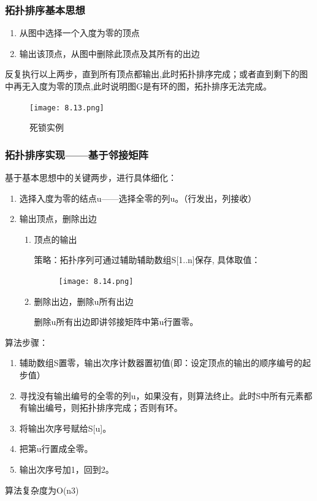 \documentclass[AutoFakeBold]{LZUThesis2007}
\begin{document}
			\subsubsection{拓扑排序基本思想}
\begin{enumerate}
	\item 从图中选择一个入度为零的顶点
	\item 输出该顶点，从图中删除此顶点及其所有的出边
\end{enumerate}
反复执行以上两步，直到所有顶点都输出,此时拓扑排序完成；或者直到剩下的图中再无入度为零的顶点,此时说明图G是有环的图，拓扑排序无法完成。
\begin{figure}[H]
    \centering
    \texttt{[image: 8.13.png]}
    \caption{死锁实例}
    \label{fig_install_texlive}
\end{figure}
			\subsubsection{拓扑排序实现——基于邻接矩阵}
基于基本思想中的关键两步，进行具体细化：
				\begin{enumerate}
					\item 选择入度为零的结点u——选择全零的列u。（行发出，列接收）
					\item 输出顶点，删除出边
						\begin{enumerate}
							\item 顶点的输出
				
				策略：拓扑序列可通过辅助辅助数组S[1..n]保存, 具体取值：
				\begin{figure}[H]
				    \centering
				    \texttt{[image: 8.14.png]}
				    
				    \label{fig_install_texlive}
				\end{figure}
				
							\item 删除出边，删除u所有出边
				
				删除u所有出边即讲邻接矩阵中第u行置零。
						\end{enumerate}
				\end{enumerate}
算法步骤：
\begin{enumerate}
	\item 辅助数组S置零，输出次序计数器置初值(即：设定顶点的输出的顺序编号的起步值）
	\item 寻找没有输出编号的全零的列u，如果没有，则算法终止。此时S中所有元素都有输出编号，则拓扑排序完成；否则有环。
	\item 将输出次序号赋给S[u]。
	\item 把第u行置成全零。
	\item 输出次序号加1，回到2。

\end{enumerate}
算法复杂度为O(n3)
\end{document}
